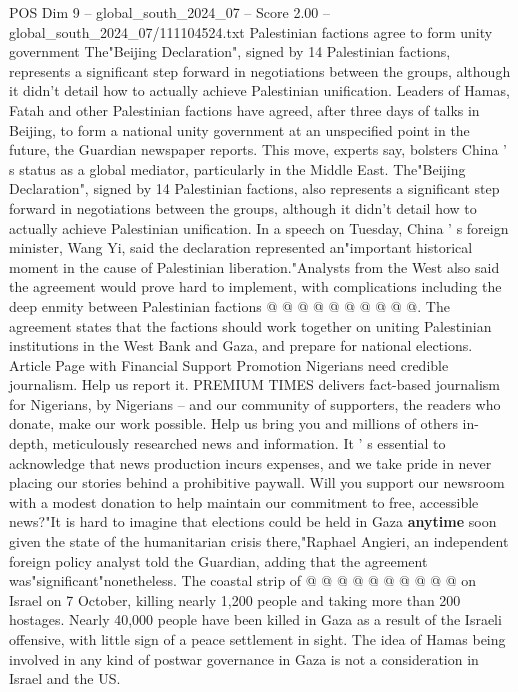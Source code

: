 \begin{textsample}{POS Dim 9 – global\_south\_2024\_07 – Score 2.00 – global\_south\_2024\_07/111104524.txt}  \label{ex:f9_pos_109}
Palestinian factions agree to form unity government The"Beijing Declaration", signed by 14 Palestinian factions, represents a significant step forward in negotiations between the groups, although it didn't detail how to actually achieve Palestinian unification.
Leaders of Hamas, Fatah and other Palestinian factions have agreed, after three days of talks in Beijing, to form a national unity government at an unspecified point in the future, the Guardian newspaper reports.
This move, experts say, bolsters China ' s status as a global mediator, particularly in the Middle East.
The"Beijing Declaration", signed by 14 Palestinian factions, also represents a significant step forward in negotiations between the groups, although it didn't detail how to actually achieve Palestinian unification.
In a speech on Tuesday, China ' s foreign minister, Wang Yi, said the declaration represented an"important historical moment in the cause of Palestinian liberation."Analysts from the West also said the agreement would prove hard to implement, with complications including the deep enmity between Palestinian factions @ @ @ @ @ @ @ @ @ @.
The agreement states that the factions should work together on uniting Palestinian institutions in the West Bank and Gaza, and prepare for national elections.
Article Page with Financial Support Promotion Nigerians need credible journalism.
Help us report it.
PREMIUM TIMES delivers fact-based journalism for Nigerians, by Nigerians -- and our community of supporters, the readers who donate, make our work possible.
Help us bring you and millions of others in-depth, meticulously researched news and information.
It ' s essential to acknowledge that news production incurs expenses, and we take pride in never placing our stories behind a prohibitive paywall.
Will you support our newsroom with a modest donation to help maintain our commitment to free, accessible news?"It is hard to imagine that elections could be held in Gaza \textbf{anytime} soon given the state of the humanitarian crisis there,"Raphael Angieri, an independent foreign policy analyst told the Guardian, adding that the agreement was"significant"nonetheless.
The coastal strip of @ @ @ @ @ @ @ @ @ @ on Israel on 7 October, killing nearly 1,200 people and taking more than 200 hostages.
Nearly 40,000 people have been killed in Gaza as a result of the Israeli offensive, with little sign of a peace settlement in sight.
The idea of Hamas being involved in any kind of postwar governance in Gaza is not a consideration in Israel and the US.

\end{textsample}
